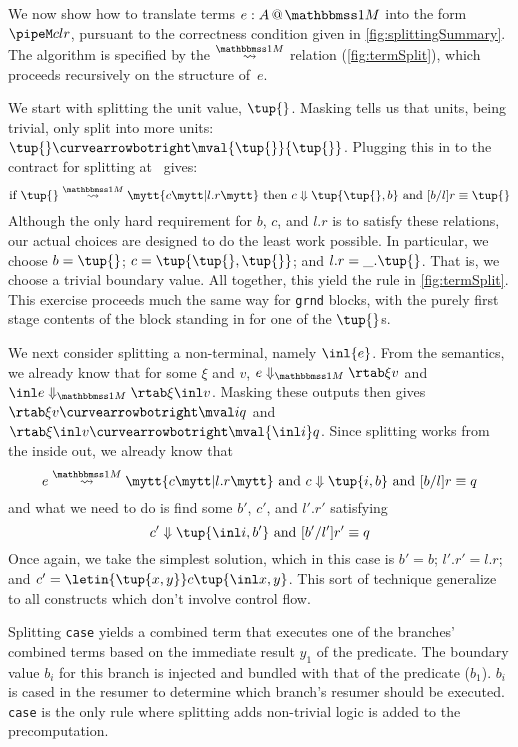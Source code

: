 \begin{abstrsyn}
We now show how to translate terms $\colmix e A$ into the form $\pipeM c l r$,
pursuant to the correctness condition given in \ref{fig:splittingSummary}.
The algorithm is specified by the $\splitonesym$ relation (\cref{fig:termSplit}), 
which proceeds recursively on the structure of~$e$.

We start with splitting the unit value, $\tup{}$.
Masking tells us that units, being trivial, only split into more units: $\tup{} \vsplito \mval {\tup{}} {\tup{}}$.
Plugging this in to the contract for splitting at \bbonem\ gives:
\[
	\text{if } \splitone {\tup {}} A c {l.r} \text{ then } \reduce c {\tup{\tup{},b}} \text{ and } [b/l]r \equiv \tup{}
\]
Although the only hard requirement for $b$, $c$, and $l.r$ is to satisfy these relations,
our actual choices are designed to do the least work possible.
In particular, we choose $b = \tup{}$; $c=\tup{\tup{},\tup{}}$; and $l.r = \_.\tup{}$.
That is, we choose a trivial boundary value.
All together, this yield the rule in \cref{fig:termSplit}.
This exercise proceeds much the same way for \texttt{grnd} blocks, 
with the purely first stage contents of the block standing in for one of the $\tup{}$s.

We next consider splitting a non-terminal, namely $\inl {e}$.
From the semantics, we already know that 
for some $\xi$ and $v$, $\diaone {e} \xi v$ and $\diaone {\inl e} \xi {\inl v}$.
Masking these outputs then gives $\rtab \xi v \vsplito \mval i q$ 
and $\rtab \xi {\inl v} \vsplito \mval {\inl i} q$.
Since splitting works from the inside out, we already know that
\[
	\splitone e A c {l.r} \text{ and } \reduce c {\tup{i,b}} \text{ and } [b/l]r \equiv q
\]
and what we need to do is find some $b'$, $c'$, and $l'.r'$ satisfying
\[
	\reduce {c'} {\tup{\inl i,b'}} \text{ and } [b'/l']r' \equiv q
\]
Once again, we take the simplest solution, which in this case is $b' = b$; $l'.r' = l.r$;
and $c' = \letin {\tup {x,y}} c {\tup{\inl x, y}}$.  
This sort of technique generalize to all constructs which don't involve control flow.


Splitting {\tt case} yields a combined term that executes one of the branches' combined terms based on the immediate result $y_1$ of the predicate.
The boundary value $b_i$ for this branch is injected and bundled with that of the predicate ($b_1$).   
$b_i$ is cased in the resumer to determine which branch's resumer should be executed.
{\tt case} is the only rule where splitting adds non-trivial logic is added to the precomputation.


\end{abstrsyn}

